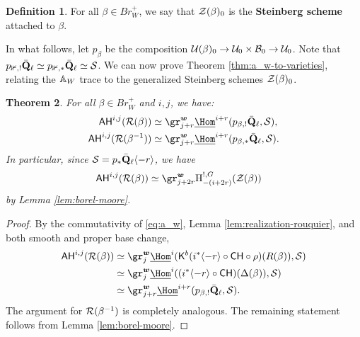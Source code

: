 \documentclass[a4paper,10pt,leqno]{amsart}
\theoremstyle{plain}
\theoremstyle{plain}
\newtheorem{thm}{Theorem}[subsection]
\theoremstyle{plain}
\theoremstyle{definition}
\newtheorem{df}[thm]{Definition}
\theoremstyle{remark}
\newcommand{\dfemph}[1]{\textbf{#1}}
\newcommand{\Br}{\mathit{Br}}
\newcommand{\QL}{\bar{\mathbf{Q}}_\ell}
\begin{document}
\begin{df}
For all $\beta \in \Br_W^+$, we say that $\cal{Z}(\beta)_0$ is the \dfemph{Steinberg scheme} attached to $\beta$.
\end{df}

In what follows, let $p_\beta$ be the composition $\cal{U}(\beta)_0 \to \cal{U}_0 \times \cal{B}_0 \to \cal{U}_0$.
Note that $p_{\bb{1}, !}\QL \simeq p_{\bb{1}, \ast}\QL \simeq \cal{S}$.
We can now prove Theorem \ref{thm:a_w-to-varieties}, relating the $\bb{A}_W$ trace to the generalized Steinberg schemes $\cal{Z}(\beta)_0$.

\begin{thm}\label{thm:a_w-to-varieties-strong}
For all $\beta \in \Br_W^+$ and $i, j$, we have:
\begin{align}
\sf{AH}^{i, j}(\cal{R}(\beta))
	&\simeq \gr_{j + r}^{\bm{w}} \SHom^{i + r}(p_{\beta, !}\QL, \cal{S}),\\
\sf{AH}^{i, j}(\cal{R}(\beta^{-1}))
	&\simeq \gr_{j + r}^{\bm{w}} \SHom^{i + r}(p_{\beta, \ast}\QL, \cal{S}).
\end{align}
In particular, since $\cal{S} = p_\ast \QL\langle -r\rangle$, we have
\begin{align}\begin{split}
\sf{AH}^{i, j}(\cal{R}(\beta))
	&\simeq \gr_{j + 2r}^{\bm{w}} \ur{H}_{-(i + 2r)}^{!, G}(\cal{Z}(\beta))
\end{split}\end{align}
by Lemma \ref{lem:borel-moore}.
\end{thm}

\begin{proof}
By the commutativity of \eqref{eq:a_w}, Lemma \ref{lem:realization-rouquier}, and both smooth and proper base change,
\begin{align}\begin{split}
\sf{AH}^{i, j}(\cal{R}(\beta)) 
&\simeq 	\gr_j^{\bm{w}} \SHom^i(\sf{K}^b(i^\ast\langle -r\rangle \circ \sf{CH} \circ \rho)(R(\beta)), \cal{S})\\
&\simeq 	\gr_j^{\bm{w}} \SHom^i((i^\ast\langle -r\rangle \circ \sf{CH})(\Delta(\beta)), \cal{S})\\
&\simeq 	\gr_{j + r}^{\bm{w}} \SHom^{i + r}(p_{\beta, !} \QL, \cal{S}).
\end{split}\end{align}
The argument for $\cal{R}(\beta^{-1})$ is completely analogous.
The remaining statement follows from Lemma \ref{lem:borel-moore}.
\end{proof}
\end{document}
